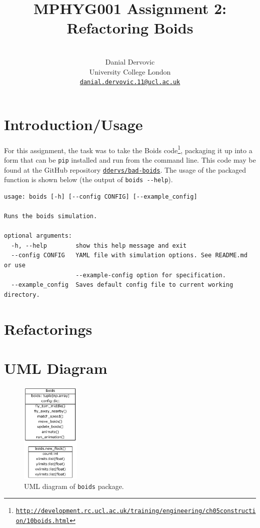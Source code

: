 \documentclass{article}
\title{MPHYG001 Assignment 2: Refactoring Boids}
\author{\\
Danial Dervovic\\
\normalsize University College London\\
\normalsize \href{mailto:danial.dervovic.11@ucl.ac.uk}{\texttt{danial.dervovic.11@ucl.ac.uk}}
}
\begin{document}
\maketitle
\section*{Introduction/Usage}
For this assignment, the task was to take the Boids code\footnote{\href{http://development.rc.ucl.ac.uk/training/engineering/ch05construction/10boids.html}{\texttt{http://development.rc.ucl.ac.uk/training/engineering/ch05construction/10boids.html}}}, packaging it up into a form that can be \texttt{pip} installed and run from the command line. This code may be found at the GitHub repository \href{https://github.com/ddervs/bad-boids}{\texttt{ddervs/bad-boids}}. The usage of the packaged function is shown below (the output of \texttt{boids -{}-help}).
\begin{lstlisting}
usage: boids [-h] [--config CONFIG] [--example_config]

Runs the boids simulation.

optional arguments:
  -h, --help        show this help message and exit
  --config CONFIG   YAML file with simulation options. See README.md or use
                    --example-config option for specification.
  --example_config  Saves default config file to current working directory.
\end{lstlisting}
\section*{Refactorings}

\section*{UML Diagram}
\begin{figure}[h]
\centering
\includegraphics[width=0.25\textwidth]{UML}
\caption{UML diagram of \texttt{boids} package.}
\label{fig:UML}
\end{figure}
\end{document}
